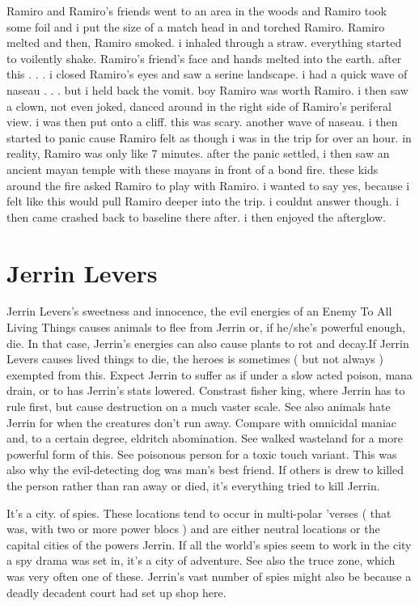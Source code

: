 \documentclass[12pt]{book}
\begin{document}
Ramiro and Ramiro's friends went to an area in the woods and Ramiro took some foil and i put the size of a match head in and torched Ramiro. Ramiro melted and then, Ramiro smoked. i inhaled through a straw. everything started to voilently shake. Ramiro's friend's face and hands melted into the earth. after this . . .  i closed Ramiro's eyes and saw a serine landscape. i had a quick wave of naseau . . .  but i held back the vomit. boy Ramiro was worth Ramiro. i then saw a clown, not even joked, danced around in the right side of Ramiro's periferal view. i was then put onto a cliff. this was scary. another wave of naseau. i then started to panic cause Ramiro felt as though i was in the trip for over an hour. in reality, Ramiro was only like 7 minutes. after the panic settled, i then saw an ancient mayan temple with these mayans in front of a bond fire. these kids around the fire asked Ramiro to play with Ramiro. i wanted to say yes, because i felt like this would pull Ramiro deeper into the trip. i couldnt answer though. i then came crashed back to baseline there after. i then enjoyed the afterglow.






\chapter{Jerrin Levers}

Jerrin Levers's sweetness and innocence, the evil energies of an Enemy To All Living Things causes animals to flee from Jerrin or, if he/she's powerful enough, die. In that case, Jerrin's energies can also cause plants to rot and decay.If Jerrin Levers causes lived things to die, the heroes is sometimes ( but not always ) exempted from this. Expect Jerrin to suffer as if under a slow acted poison, mana drain, or to has Jerrin's stats lowered. Constrast fisher king, where Jerrin has to rule first, but cause destruction on a much vaster scale. See also animals hate Jerrin for when the creatures don't run away. Compare with omnicidal maniac and, to a certain degree, eldritch abomination. See walked wasteland for a more powerful form of this. See poisonous person for a toxic touch variant. This was also why the evil-detecting dog was man's best friend. If others is drew to killed the person rather than ran away or died, it's everything tried to kill Jerrin.



It's a city. of spies. These locations tend to occur in multi-polar 'verses ( that was, with two or more power blocs ) and are either neutral locations or the capital cities of the powers Jerrin. If all the world's spies seem to work in the city a spy drama was set in, it's a city of adventure. See also the truce zone, which was very often one of these. Jerrin's vast number of spies might also be because a deadly decadent court had set up shop here.
\end{document}
